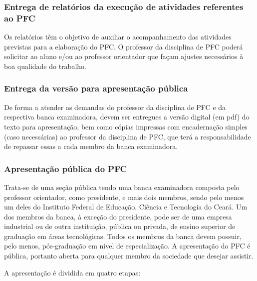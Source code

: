 \subsubsection{Entrega de relatórios da execução de atividades referentes ao PFC}

Os relatórios têm o objetivo de auxiliar o acompanhamento das atividades previstas para a elaboração do PFC. O
professor da disciplina de PFC poderá solicitar ao aluno e/ou ao professor orientador que façam ajustes necessários à
boa qualidade do trabalho.

\subsubsection{Entrega da versão para apresentação pública}

De forma a atender as demandas do professor da disciplina de PFC e da respectiva banca examinadora, devem ser entregues a versão digital (em pdf) do texto para apresentação, bem como cópias impressas com encadernação simples (caso necessárias) ao professor da disciplina de PFC, que terá a responsabilidade de repassar essas a cada membro da banca examinadora.

\subsubsection{Apresentação pública do PFC}

Trata-se de uma seção pública tendo uma banca examinadora composta pelo professor orientador, como presidente, e mais dois membros, sendo pelo menos um deles do Instituto Federal de Educação, Ciência e Tecnologia do Ceará. Um dos membros da banca, à exceção do presidente, pode ser de uma empresa industrial ou de outra instituição, pública ou privada, de ensino superior de graduação em áreas tecnológicas.  Todos os membros da banca devem possuir, pelo menos, pós-graduação em nível de especialização.  A apresentação do PFC é pública, portanto aberta para qualquer membro da sociedade que desejar assistir.

A apresentação é dividida em quatro etapas:

